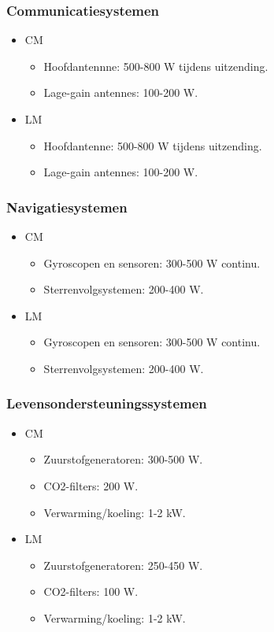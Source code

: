 \subsubsection{Communicatiesystemen}
\begin{itemize}
    \item CM
    \begin{itemize}
        \item Hoofdantennne: 500-800 W tijdens uitzending.
        \item Lage-gain antennes: 100-200 W.
    \end{itemize}
    \item LM
    \begin{itemize}
        \item Hoofdantenne: 500-800 W tijdens uitzending.
        \item Lage-gain antennes: 100-200 W.
    \end{itemize}
\end{itemize}

\subsubsection{Navigatiesystemen}
\begin{itemize}
    \item CM
    \begin{itemize}
        \item Gyroscopen en sensoren: 300-500 W continu.
        \item Sterrenvolgsystemen: 200-400 W.
    \end{itemize}
    \item LM
    \begin{itemize}
        \item Gyroscopen en sensoren: 300-500 W continu.
        \item Sterrenvolgsystemen: 200-400 W.
    \end{itemize}
\end{itemize}

\subsubsection{Levensondersteuningssystemen}
\begin{itemize}
    \item CM
    \begin{itemize}
        \item Zuurstofgeneratoren: 300-500 W.
        \item CO2-filters: 200 W.
        \item Verwarming/koeling: 1-2 kW.
    \end{itemize}
    \item LM
    \begin{itemize}
        \item Zuurstofgeneratoren: 250-450 W.
        \item CO2-filters: 100 W.
        \item Verwarming/koeling: 1-2 kW.
    \end{itemize}
\end{itemize}

